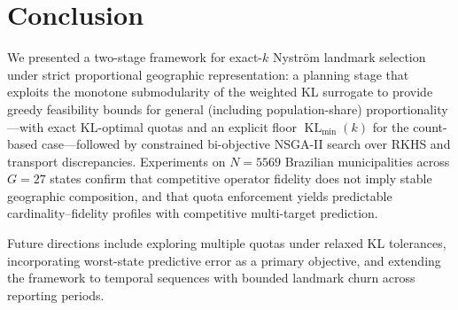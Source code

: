 \documentclass[10pt,journal]{IEEEtran}
\newcommand{\1}{\mathbf{1}}
\DeclareMathOperator{\KL}{KL}
\theoremstyle{ieeethm}
\begin{document}
\section{Conclusion}
\label{sec:conclusion}

We presented a two-stage framework for exact-$k$ Nyström landmark selection under strict
proportional geographic representation: a planning stage that exploits the monotone submodularity
of the weighted KL surrogate to provide greedy feasibility bounds for general (including
population-share) proportionality---with exact KL-optimal quotas and an explicit floor
$\KL_{\min}(k)$ for the count-based case---followed by constrained bi-objective NSGA-II search
over RKHS and transport discrepancies. Experiments on $N=5569$ Brazilian municipalities across
$G=27$ states confirm that competitive operator fidelity does not imply stable geographic
composition, and that quota enforcement yields predictable cardinality--fidelity profiles with
competitive multi-target prediction.

Future directions include exploring multiple quotas under relaxed KL tolerances, incorporating
worst-state predictive error as a primary objective, and extending the framework to temporal
sequences with bounded landmark churn across reporting periods.








\end{document}
